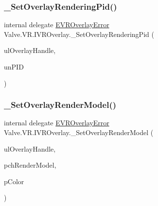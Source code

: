 \mbox{\label{struct_valve_1_1_v_r_1_1_i_v_r_overlay_a8f638ca89f20888242e2232fd3e0c0e2}} 
\subsubsection{\texorpdfstring{\_SetOverlayRenderingPid()}{\_SetOverlayRenderingPid()}}
{\footnotesize\ttfamily internal delegate \mbox{\hyperlink{namespace_valve_1_1_v_r_aaee5c5144f42b7969d45b854f51b0c18}{E\+V\+R\+Overlay\+Error}} Valve.\+V\+R.\+I\+V\+R\+Overlay.\+\_\+\+Set\+Overlay\+Rendering\+Pid (\begin{DoxyParamCaption}\item[{ulong}]{ul\+Overlay\+Handle,  }\item[{uint}]{un\+P\+ID }\end{DoxyParamCaption})}

\mbox{\label{struct_valve_1_1_v_r_1_1_i_v_r_overlay_a1bbe01ba8283e551d3d818e31199e39b}} 
\subsubsection{\texorpdfstring{\_SetOverlayRenderModel()}{\_SetOverlayRenderModel()}}
{\footnotesize\ttfamily internal delegate \mbox{\hyperlink{namespace_valve_1_1_v_r_aaee5c5144f42b7969d45b854f51b0c18}{E\+V\+R\+Overlay\+Error}} Valve.\+V\+R.\+I\+V\+R\+Overlay.\+\_\+\+Set\+Overlay\+Render\+Model (\begin{DoxyParamCaption}\item[{ulong}]{ul\+Overlay\+Handle,  }\item[{string}]{pch\+Render\+Model,  }\item[{ref \mbox{\hyperlink{struct_valve_1_1_v_r_1_1_hmd_color__t}{Hmd\+Color\+\_\+t}}}]{p\+Color }\end{DoxyParamCaption})}

\mbox{\label{struct_valve_1_1_v_r_1_1_i_v_r_overlay_a49aeba8cdd673c4e9b5e5e3cc1e566d6}} 
